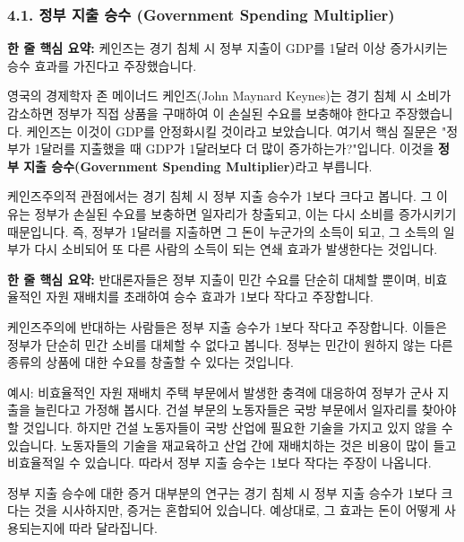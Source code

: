 \documentclass[11pt,a4paper]{article}
\theoremstyle{definition}
\begin{document}
\subsubsection*{4.1. 정부 지출 승수 (Government Spending Multiplier)}

\begin{tcolorbox}[mybox={케인즈주의적 관점}]
    \textbf{한 줄 핵심 요약:} 케인즈는 경기 침체 시 정부 지출이 GDP를 1달러 이상 증가시키는 승수 효과를 가진다고 주장했습니다.
\end{tcolorbox}

영국의 경제학자 존 메이너드 케인즈(John Maynard Keynes)는 경기 침체 시 소비가 감소하면 정부가 직접 상품을 구매하여 이 손실된 수요를 보충해야 한다고 주장했습니다. 케인즈는 이것이 GDP를 안정화시킬 것이라고 보았습니다. 여기서 핵심 질문은 "정부가 1달러를 지출했을 때 GDP가 1달러보다 더 많이 증가하는가?"입니다. 이것을 \textbf{정부 지출 승수(Government Spending Multiplier)}라고 부릅니다.

케인즈주의적 관점에서는 경기 침체 시 정부 지출 승수가 1보다 크다고 봅니다. 그 이유는 정부가 손실된 수요를 보충하면 일자리가 창출되고, 이는 다시 소비를 증가시키기 때문입니다. 즉, 정부가 1달러를 지출하면 그 돈이 누군가의 소득이 되고, 그 소득의 일부가 다시 소비되어 또 다른 사람의 소득이 되는 연쇄 효과가 발생한다는 것입니다.

\begin{tcolorbox}[mybox={케인즈주의 반대 관점}]
    \textbf{한 줄 핵심 요약:} 반대론자들은 정부 지출이 민간 수요를 단순히 대체할 뿐이며, 비효율적인 자원 재배치를 초래하여 승수 효과가 1보다 작다고 주장합니다.
\end{tcolorbox}

케인즈주의에 반대하는 사람들은 정부 지출 승수가 1보다 작다고 주장합니다. 이들은 정부가 단순히 민간 소비를 대체할 수 없다고 봅니다. 정부는 민간이 원하지 않는 다른 종류의 상품에 대한 수요를 창출할 수 있다는 것입니다.

\begin{examplebox}{예시: 비효율적인 자원 재배치}
    주택 부문에서 발생한 충격에 대응하여 정부가 군사 지출을 늘린다고 가정해 봅시다. 건설 부문의 노동자들은 국방 부문에서 일자리를 찾아야 할 것입니다. 하지만 건설 노동자들이 국방 산업에 필요한 기술을 가지고 있지 않을 수 있습니다. 노동자들의 기술을 재교육하고 산업 간에 재배치하는 것은 비용이 많이 들고 비효율적일 수 있습니다. 따라서 정부 지출 승수는 1보다 작다는 주장이 나옵니다.
\end{examplebox}

\begin{summarybox}{정부 지출 승수에 대한 증거}
    대부분의 연구는 경기 침체 시 정부 지출 승수가 1보다 크다는 것을 시사하지만, 증거는 혼합되어 있습니다. 예상대로, 그 효과는 돈이 어떻게 사용되는지에 따라 달라집니다.
\end{summarybox}
\end{document}
